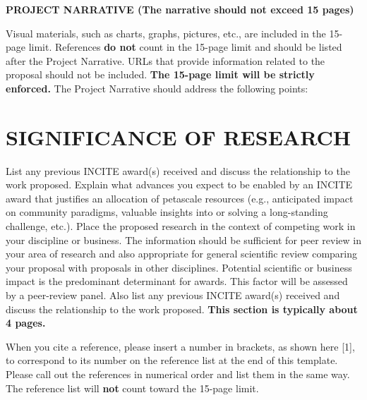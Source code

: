 \documentclass[11pt,letterpaper,english]{article}
\begin{document}
\setlength{\parindent}{0in} %

\pagestyle{fancy}   \renewcommand{%
\headrulewidth}{0.0pt}

\begin{center}
{\bf PROJECT NARRATIVE (The narrative should not exceed 15 pages)} 
\end{center}

\vspace{-.15in}



Visual materials, such as charts, graphs, pictures, etc., are included in the 15-page limit. References {\bf do not} count in the 15-page limit and should be listed after the Project Narrative. URLs that provide information related to the proposal should not be included. {\bf The 15-page limit will be strictly enforced.}  The Project Narrative should address the following points:

\vspace{-.25in}
\section{SIGNIFICANCE OF RESEARCH}
\vspace{-.2in}
List any previous INCITE award(s) received and discuss the relationship to the work proposed. Explain what advances you expect to be enabled by an INCITE award that justifies an allocation of petascale resources (e.g., anticipated impact on community paradigms, valuable insights into or solving a long-standing challenge, etc.). Place the proposed research in the context of competing work in your discipline or business. The information should be sufficient for peer review in your area of research and also appropriate for general scientific review comparing your proposal with proposals in other disciplines. Potential scientific or business impact is the predominant determinant for awards. This factor will be assessed by a peer-review panel. Also list any previous INCITE award(s) received and discuss the relationship to the work proposed. {\bf This section is typically about 4 pages.}

When you cite a reference, please insert a number in brackets, as shown here [1], to correspond to its number on the reference list at the end of this template. Please call out the references in numerical order and list them in the same way. The reference list will {\bf not} count toward the 15-page limit.
\end{document}
